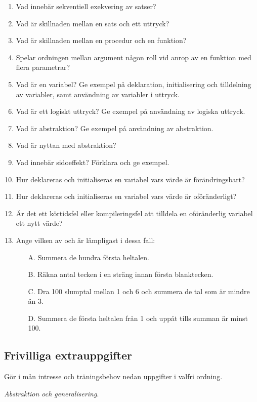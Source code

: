 \begin{enumerate}
\item Vad innebär sekventiell exekvering av satser?
\item Vad är skillnaden mellan en sats och ett uttryck?
\item Vad är skillnaden mellan en procedur och en funktion?
\item Spelar ordningen mellan argument någon roll vid anrop av en funktion med flera parametrar?
\item Vad är en variabel? Ge exempel på deklaration, initialisering och tilldelning av variabler, samt användning av variabler i uttryck.
\item Vad är ett logiskt uttryck? Ge exempel på användning av logiska uttryck.
\item Vad är abstraktion? Ge exempel på användning av abstraktion.
\item Vad är nyttan med abstraktion?
\item Vad innebär sidoeffekt? Förklara och ge exempel.
\item Hur deklareras och initialiseras en variabel vars värde är förändringsbart?
\item Hur deklareras och initialiseras en variabel vars värde är oföränderligt?
\item Är det ett körtidsfel eller kompileringsfel att tilldela en oföränderlig variabel ett nytt värde?
\item Ange vilken av  och  är lämpligast i dessa fall:
\begin{itemize}[noitemsep, nolistsep]
\item[A.] Summera de hundra första heltalen.
\item[B.] Räkna antal tecken i en sträng innan första blanktecken.
\item[C.] Dra 100 slumptal mellan 1 och 6 och summera de tal som är mindre än 3.
\item[D.] Summera de första heltalen från 1 och uppåt tills summan är minst 100.
\end{itemize}
\end{enumerate}


\subsection{Frivilliga extrauppgifter}

\noindent Gör i mån intresse och träningsbehov nedan uppgifter i valfri ordning.

\Task \emph{Abstraktion och generalisering}.

